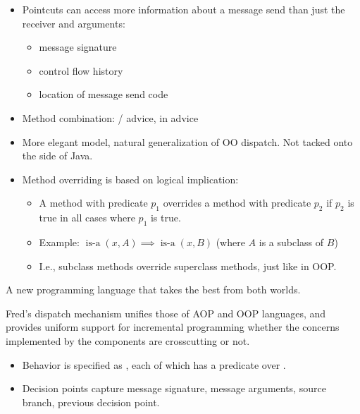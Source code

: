 \documentclass[landscape]{slides}
\begin{document}
\begin{slide}

  \begin{itemize}
    \item Pointcuts can access more information about a message send
          than just the receiver and arguments:
    \begin{itemize}
      \item message signature
      \item control flow history
      \item location of message send code
    \end{itemize}
    \item Method combination: / advice,
           in  advice
  \end{itemize}
\end{slide}

\begin{slide}

  \begin{itemize}
    \item More elegant model, natural generalization of OO dispatch.
          Not tacked onto the side of Java.
    \item Method overriding is based on logical implication:
    \begin{itemize}    
      \item A method with predicate $p_1$ overrides a method with
            predicate $p_2$ if $p_2$ is true in all cases where $p_1$ is 
            true.
      \item Example: $\operatorname{is-a}(x,A) \implies
            \operatorname{is-a}(x,B)$ (where $A$ is a subclass of $B$)
      \item I.e., subclass methods override superclass methods, just
            like in OOP.
    \end{itemize}
  \end{itemize}
\end{slide}

\begin{slide}

  A new programming language that takes the best from both worlds.

  Fred's dispatch mechanism unifies those of AOP and OOP languages,
  and provides uniform support for incremental programming whether the
  concerns implemented by the components are crosscutting or not.

  \begin{itemize}
    \item Behavior is specified as , each of which has
          a predicate over .
    \item Decision points capture message signature, message
          arguments, source branch, previous decision point.
  \end{itemize}
\end{slide}
\end{document}
